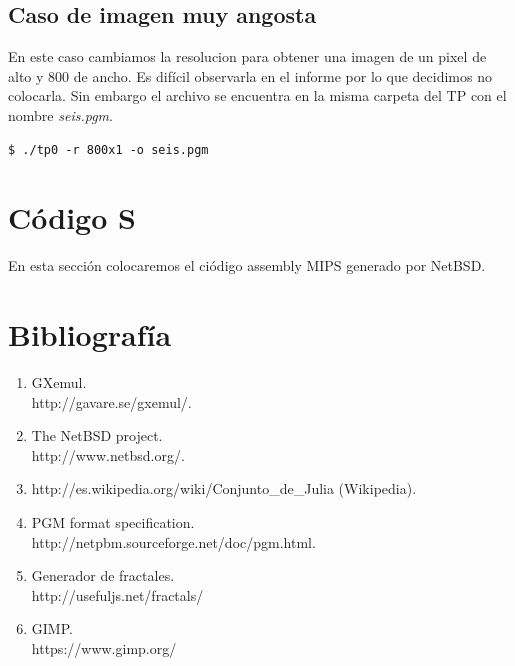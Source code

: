 \documentclass[a4paper,10pt]{article}
\begin{document}
\newpage

\subsection{Caso de imagen muy angosta}
En este caso cambiamos la resolucion para obtener una imagen de un pixel
de alto y 800 de ancho. \newline
Es dif\'{i}cil observarla en el informe por lo que decidimos no colocarla. Sin embargo el archivo se encuentra en la misma carpeta del TP con el nombre \textit{seis.pgm}.

\begin{lstlisting}[frame=single]
$ ./tp0 -r 800x1 -o seis.pgm
\end{lstlisting}

\section{C\'{o}digo S}

En esta secci\'{o}n colocaremos el ci\'{o}digo assembly MIPS generado por NetBSD.



\section{Bibliograf\'{i}a}
\begin{enumerate}
\item GXemul. \\ http://gavare.se/gxemul/.
\item The NetBSD project. \\
	http://www.netbsd.org/.
\item http://es.wikipedia.org/wiki/Conjunto\_de\_Julia (Wikipedia).
\item PGM format specification.\\
	http://netpbm.sourceforge.net/doc/pgm.html.
\item Generador de fractales. \\
	http://usefuljs.net/fractals/
\item GIMP. \\
	https://www.gimp.org/
\end{enumerate}
\end{document}
